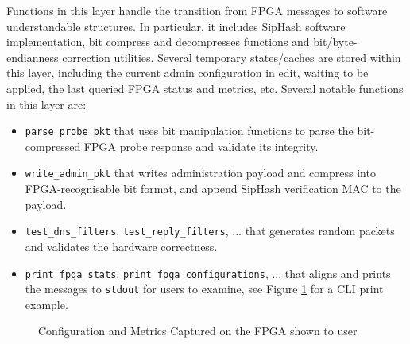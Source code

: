 \documentclass[a4paper]{report}
\newcommand{\code}{\texttt}
\begin{document}
Functions in this layer handle the transition from FPGA messages to software understandable structures. In particular, it includes SipHash software implementation, bit compress and decompresses functions and bit/byte-endianness correction utilities. Several temporary states/caches are stored within this layer, including the current admin configuration in edit, waiting to be applied, the last queried FPGA status and metrics, etc. Several notable functions in this layer are:
\begin{itemize}
    \item \code{parse\_probe\_pkt} that uses bit manipulation functions to parse the bit-compressed FPGA probe response and validate its integrity.
    \item \code{write\_admin\_pkt} that writes administration payload and compress into FPGA-recognisable bit format, and append SipHash verification MAC to the payload.
    \item \code{test\_dns\_filters}, \code{test\_reply\_filters}, ... that generates random packets and validates the hardware correctness.
    \item \code{print\_fpga\_stats}, \code{print\_fpga\_configurations}, ... that aligns and prints the messages to \code{stdout} for users to examine, see Figure \ref{fig:console-screenshot} for a CLI print example.
\end{itemize}

\begin{figure}[h!]
  \caption{Configuration and Metrics Captured on the FPGA shown to user}
  \label{fig:console-screenshot}
\end{figure}
\end{document}

